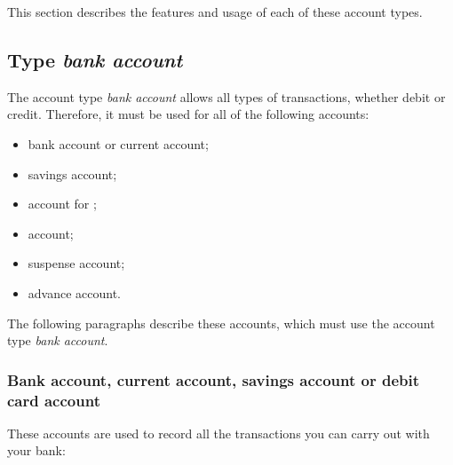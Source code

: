 This section describes the features and usage of each of these account types.



\subsection{Type \emph{bank account}\label{accounts-type-bank}}%

The account type \emph{bank account} allows all types of transactions, whether debit or credit. Therefore, it must be used for all of the following accounts:
\begin{itemize}
	\item bank account or current account;
	\item savings account;
	\item account for ;
	\item {} account;
	\item suspense account;
	\item advance account.
\end{itemize}

The following paragraphs describe these accounts, which must use the account type \emph{bank account}.


\subsubsection{Bank account, current account, savings account or debit card account\label{accounts-type-bank-misc}}

These accounts are used to record all the transactions you can carry out with your bank:


